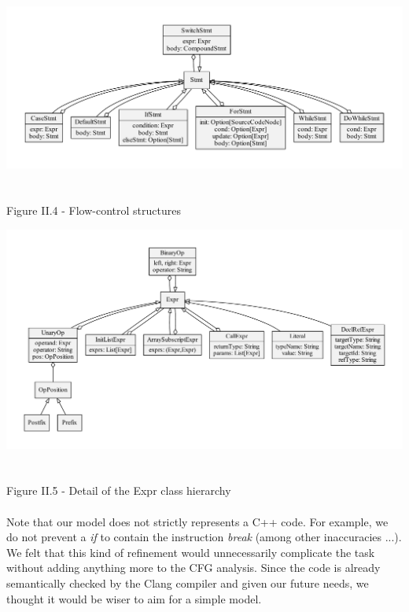 \documentclass{report}
\begin{document}
\begin{center}
\includegraphics[scale=0.5]{data/flow_control_Stmt_classes}
~\\~\\Figure II.4 - Flow-control structures
\end{center}

\begin{center}
\includegraphics[scale=0.5]{data/Expr_classes}
~\\~\\Figure II.5 - Detail of the Expr class hierarchy
\end{center}

\paragraph{}
\hspace{4mm}Note that our model does not strictly represents a C++ code. For example, we do not prevent a \textit{if} to contain the instruction \textit{break}
(among other inaccuracies ...). We felt that this kind of refinement would unnecessarily complicate the task without adding anything more to the CFG analysis. 
Since the code is already semantically checked by the Clang compiler and given our future needs, we thought it would be wiser to aim for a simple model.
\end{document}
